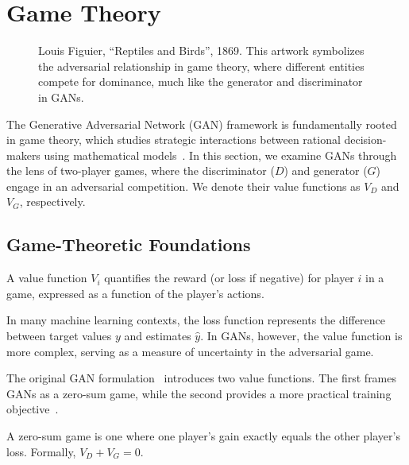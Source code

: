 \section{Game Theory}%
\label{sec:game-theory}
\vspace{0.5cm}
\begin{figure}[h!]%
  \label{fig:paradise}
  \centering
  \caption{Louis Figuier, ``Reptiles and Birds'', 1869. This artwork symbolizes the adversarial relationship in game theory, where different entities compete for dominance, much like the generator and discriminator in GANs.}
\end{figure}
\vspace{0.5cm}

The Generative Adversarial Network (GAN) framework is fundamentally rooted in game theory, which studies strategic interactions between rational decision-makers using mathematical models~\cite{ref:myerson}. In this section, we examine GANs through the lens of two-player games, where the discriminator ($D$) and generator ($G$) engage in an adversarial competition. We denote their value functions as $V_D$ and $V_G$, respectively.

\subsection{Game-Theoretic Foundations}

\begin{definition}%
  \label{def:value-function}
  A \textnormal{\sffamily value function} $V_i$ quantifies the reward (or loss if negative) for player $i$ in a game, expressed as a function of the player's actions.
\end{definition}

\begin{remark}
  In many machine learning contexts, the loss function represents the difference between target values $y$ and estimates $\hat{y}$. In GANs, however, the value function is more complex, serving as a measure of uncertainty in the adversarial game.
\end{remark}

The original GAN formulation~\cite{ref:goodfellow-original} introduces two value functions. The first frames GANs as a zero-sum game, while the second provides a more practical training objective~\cite{ref:gidel-variational-2018}.

\begin{definition}%
  \label{def:zero-sum-game}
  A \textnormal{\sffamily zero-sum game} is one where one player's gain exactly equals the other player's loss. Formally, $V_D + V_G = 0$.
\end{definition}

